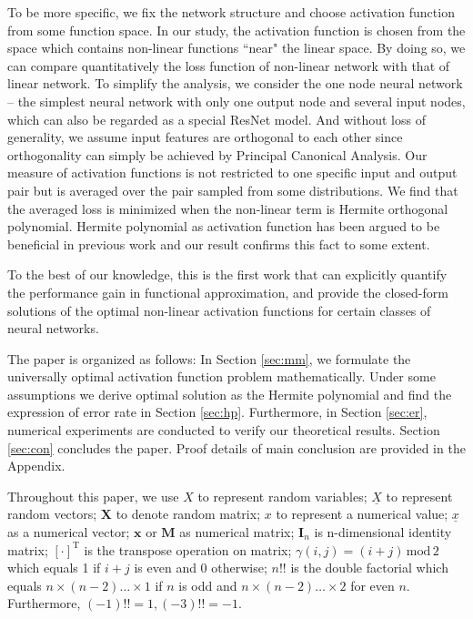 \documentclass[conference]{IEEEtran}
\def\T{\mathrm{T}}
\newcommand{\ide}[2]{ \gamma(#1,#2) }
\begin{document}
To be more specific, we fix the network structure and choose activation function from some function space.
In our study, the activation function is chosen from the space which contains non-linear functions ``near" the linear space.
By doing so, we can compare quantitatively the loss function of non-linear network with that of linear network.
To simplify the analysis, we consider the one node neural network -- the simplest neural network with only one output node and several input nodes, which can also be regarded as a special ResNet model.
And without loss of generality, we assume input features are orthogonal to each other since orthogonality can simply be achieved by Principal Canonical Analysis.
Our measure of activation functions is not restricted to one specific input and output pair but is averaged over the pair sampled from some distributions.
We find that the averaged loss is minimized when the non-linear term is Hermite orthogonal polynomial.
Hermite polynomial as activation function has been argued to be beneficial in previous work \cite{ma2005constructive} and our result confirms this fact to some extent.


To the best of our knowledge, this is the first work that can explicitly quantify the performance gain in functional approximation, and provide the closed-form solutions of the optimal non-linear activation functions for certain classes of neural networks.

The paper is organized as follows: In Section \ref{sec:mm}, we formulate the universally optimal activation function problem
mathematically.
Under some assumptions we derive optimal solution as the Hermite polynomial and find the expression of error rate in Section \ref{sec:hp}.
Furthermore, in Section \ref{sec:er}, numerical experiments are conducted to verify our theoretical results.
Section \ref{sec:con} concludes the paper. Proof details of main conclusion are provided in the Appendix.

Throughout this paper, we use $X$ to represent random variables;
$\underline{X}$ to represent random vectors;
$\bm{X}$ to denote random matrix;
$x$ to represent a numerical value;
$\underline{x}$ as a numerical vector;
$\bm{x}$  or $\mathbf{M}$ as numerical matrix; $\mathbf{I}_n$ is n-dimensional identity matrix;
$[\cdot]^\T$ is the transpose operation on matrix; $\ide{i}{j} = (i+j)\, \mathrm{mod} \, 2$
which equals 1 if $ i + j$ is even and 0 otherwise;
$n!!$ is the double factorial which equals $n \times (n-2) \dots \times1$ if $n$ is odd and $n \times (n-2)\dots \times 2$ for even $n$. Furthermore, $(-1)!!=1,(-3)!!=-1$.
\end{document}
